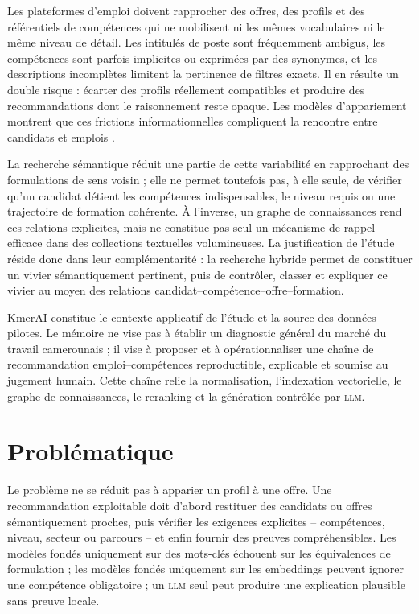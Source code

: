 \documentclass[12pt,twoside]{report}
\newcommand{\LLM}{\textsc{llm}}
\begin{document}
Les plateformes d'emploi doivent rapprocher des offres, des profils et des référentiels de compétences qui ne mobilisent ni les mêmes vocabulaires ni le même niveau de détail. Les intitulés de poste sont fréquemment ambigus, les compétences sont parfois implicites ou exprimées par des synonymes, et les descriptions incomplètes limitent la pertinence de filtres exacts. Il en résulte un double risque : écarter des profils réellement compatibles et produire des recommandations dont le raisonnement reste opaque. Les modèles d'appariement montrent que ces frictions informationnelles compliquent la rencontre entre candidats et emplois \cite{mortensen1994job,pissarides2000equilibrium}.

La recherche sémantique réduit une partie de cette variabilité en rapprochant des formulations de sens voisin ; elle ne permet toutefois pas, à elle seule, de vérifier qu'un candidat détient les compétences indispensables, le niveau requis ou une trajectoire de formation cohérente. À l'inverse, un graphe de connaissances rend ces relations explicites, mais ne constitue pas seul un mécanisme de rappel efficace dans des collections textuelles volumineuses. La justification de l'étude réside donc dans leur complémentarité : la recherche hybride permet de constituer un vivier sémantiquement pertinent, puis de contrôler, classer et expliquer ce vivier au moyen des relations candidat--compétence--offre--formation.

KmerAI constitue le contexte applicatif de l'étude et la source des données pilotes. Le mémoire ne vise pas à établir un diagnostic général du marché du travail camerounais ; il vise à proposer et à opérationnaliser une chaîne de recommandation emploi--compétences reproductible, explicable et soumise au jugement humain. Cette chaîne relie la normalisation, l'indexation vectorielle, le graphe de connaissances, le reranking et la génération contrôlée par \LLM{}.
\vspace{-0.5cm}
\section*{Problématique}
Le problème ne se réduit pas à apparier un profil à une offre. Une recommandation exploitable doit d'abord restituer des candidats ou offres sémantiquement proches, puis vérifier les exigences explicites -- compétences, niveau, secteur ou parcours -- et enfin fournir des preuves compréhensibles. Les modèles fondés uniquement sur des mots-clés échouent sur les équivalences de formulation ; les modèles fondés uniquement sur les embeddings peuvent ignorer une compétence obligatoire ; un \LLM{} seul peut produire une explication plausible sans preuve locale.
\end{document}
